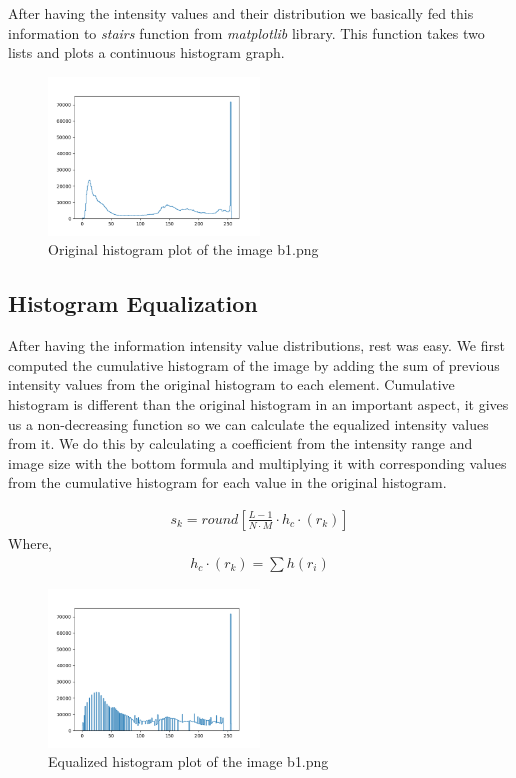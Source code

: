 \documentclass[conference]{IEEEtran}
\begin{document}
	After having the intensity values and their distribution we basically fed this information to \emph{stairs} function from \emph{matplotlib} library. This function takes two lists and plots a continuous histogram graph.

    \begin{figure}[]
    \centering
    \includegraphics[width=0.5\textwidth]{resources/original_histogram.png}
    \caption{Original histogram plot of the image b1.png}
    \label{fig:plot1}
    \end{figure}

\subsection{Histogram Equalization}
After having the information intensity value distributions, rest was easy. We first computed the cumulative histogram of the image by adding the sum of previous intensity values from the original histogram to each element. Cumulative histogram is different than the original histogram in an important aspect, it gives us a non-decreasing function so we can calculate the equalized intensity values from it. We do this by calculating a coefficient from the intensity range and image size with the bottom formula and multiplying it with corresponding values from the cumulative histogram for each value in the original histogram.

\begin{align}
	s_{k} = round[\frac{L-1}{N\cdot M}\cdot h_{c}\cdot (r_{k})]\label{Histogram equalization coefficient formula}
\end{align}
Where,
\begin{align}
	h_{c}\cdot (r_{k}) = \sum {h(r_{i})}\label{Histogram equalization coefficient formula}
\end{align}

\begin{figure}[]
    \centering
    \includegraphics[width=0.5\textwidth]{resources/equalized_histogram.png}
    \caption{Equalized histogram plot of the image b1.png}
    \label{fig:plot2}
\end{figure}
\end{document}
